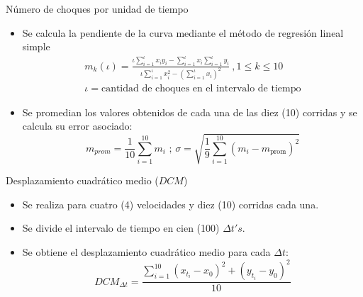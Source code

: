 \documentclass{beamer}
\begin{document}
            \begin{frame}{Número de choques por unidad de tiempo}
                \begin{itemize}
                    \item Se calcula la pendiente de la curva mediante el método de regresión lineal simple
                    \begin{equation*}
                        \begin{split}
                            m_k(\iota) = \frac{\iota \sum_{i=1}^\iota x_i y_i - \sum_{i=1}^\iota x_i \sum_{i=1}^\iota y_i }{\iota \sum_{i=1}^\iota x_i^2 - \left(\sum_{i=1}^\iota x_i \right)^2}
                            \ , 1 \leq k \leq 10
                            \\ \iota = \text{cantidad de choques en el intervalo de tiempo}
                        \end{split}
                    \end{equation*}
                    \item Se promedian los valores obtenidos de cada una de las diez (10) corridas y se calcula su error asociado:
                    \begin{equation*}
                            m_{prom} = \frac{1}{10} \sum_{i=1}^{10} m_i
                        \text{ ; }
                            \sigma = \sqrt{\frac{1}{9} \sum_{i=1}^{10} (m_i - m_{\text{prom}})^2}
                    \end{equation*}
                \end{itemize}
            \end{frame}

            \begin{frame}{Desplazamiento cuadrático medio ($DCM$)}
                \begin{itemize}
                    \item Se realiza para cuatro (4) velocidades y diez (10) corridas cada una.
                    \item Se divide el intervalo de tiempo en cien (100) $\Delta t's$.
                    \item Se obtiene el desplazamiento cuadrático medio para cada $\Delta t$:
                    \begin{equation*}
                        DCM_{\Delta t} = \frac{\sum_{i=1}^{10} \left( x_{t_i} - x_0 \right)^2 + \left( y_{t_i} - y_0 \right)^2}{10}
                    \end{equation*}

                \end{itemize}
            \end{frame}
\end{document}
